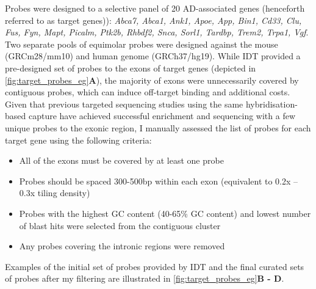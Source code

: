 
Probes were designed to a selective panel of 20 AD-associated genes (henceforth referred to as target genes)): \textit{Abca7, Abca1, Ank1, Apoe, App, Bin1, Cd33, Clu, Fus, Fyn, Mapt, Picalm, Ptk2b, Rhbdf2, Snca, Sorl1, Tardbp, Trem2, Trpa1, Vgf}. Two separate pools of equimolar probes were designed against the mouse (GRCm28/mm10) and human genome (GRCh37/hg19). While IDT provided a pre-designed set of probes to the exons of target genes (depicted in \cref{fig:target_probes_eg}\textbf{A}), the majority of exons were unnecessarily covered by contiguous probes, which can induce off-target binding and additional costs. Given that previous targeted sequencing studies using the same hybridisation-based capture have achieved successful enrichment and sequencing with a few unique probes to the exonic region\cite{Sheynkman2020}, I manually assessed the list of probes for each target gene using the following criteria:
\begin{itemize}
	\item All of the exons must be covered by at least one probe
	\item Probes should be spaced 300-500bp within each exon (equivalent to 0.2x – 0.3x tiling density) 
	\item Probes with the highest GC content (40-65\% GC content) and lowest number of blast hits were selected from the contiguous cluster 
	\item Any probes covering the intronic regions were removed
\end{itemize}
Examples of the initial set of probes provided by IDT and the final curated sets of probes after my filtering are illustrated in  \cref{fig:target_probes_eg}\textbf{B - D}. 

